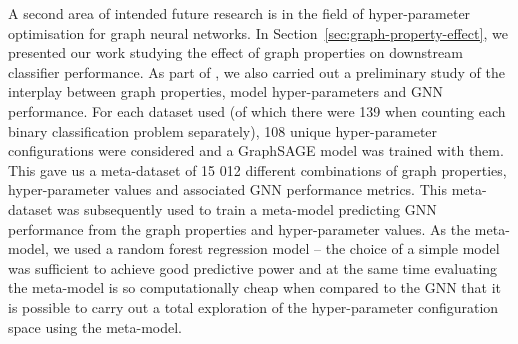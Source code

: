 A second area of intended future research is in the field of hyper-parameter optimisation for graph neural networks. In Section~\ref{sec:graph-property-effect}, we presented our work studying the effect of graph properties on downstream classifier performance. As part of \cite{prochazka_which_2023}, we also carried out a preliminary study of the interplay between graph properties, model hyper-parameters and GNN performance. For each dataset used (of which there were 139 when counting each binary classification problem separately), 108 unique hyper-parameter configurations were considered and a GraphSAGE model was trained with them. This gave us a meta-dataset of 15 012 different combinations of graph properties, hyper-parameter values and associated GNN performance metrics. This meta-dataset was subsequently used to train a meta-model predicting GNN performance from the graph properties and hyper-parameter values. As the meta-model, we used a random forest regression model -- the choice of a simple model was sufficient to achieve good predictive power and at the same time evaluating the meta-model is so computationally cheap when compared to the GNN that it is possible to carry out a total exploration of the hyper-parameter configuration space using the meta-model.

